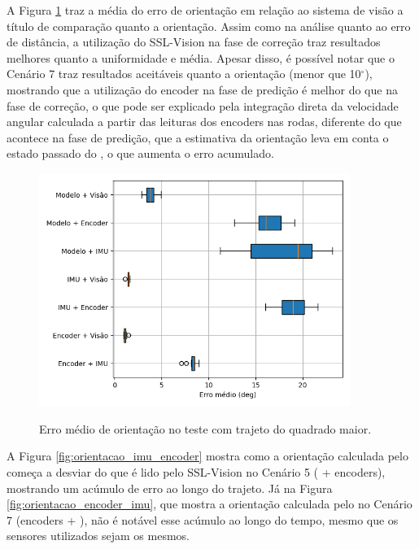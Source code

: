 \documentclass[acronym, symbols, table, deposito]{fei}
\begin{document}
		A Figura \ref{fig:erro_medio_orientacao_quad_maior} traz a média do erro de orientação em relação ao sistema de visão a título de comparação quanto a orientação. Assim como na análise quanto ao erro de distância, a utilização do SSL-Vision na fase de correção traz resultados melhores quanto a uniformidade e média. Apesar disso, é possível notar que o Cenário 7 traz resultados aceitáveis quanto a orientação (menor que 10$^\circ$), mostrando que a utilização do encoder na fase de predição é melhor do que na fase de correção, o que pode ser explicado pela integração direta da velocidade angular calculada a partir das leituras dos encoders nas rodas, diferente do que acontece na fase de predição, que a estimativa da orientação leva em conta o estado passado do , o que aumenta o erro acumulado.
	
		\begin{figure}[!htb]
			\centering
			\caption{Erro médio de orientação no teste com trajeto do quadrado maior.}
			\includegraphics[width=0.9\textwidth]{../Dados/Graficos-Resultados/erro_medio_orientacao_quadrado_maior.png}
			\label{fig:erro_medio_orientacao_quad_maior}
		\end{figure}
	
		A Figura \ref{fig:orientacao_imu_encoder} mostra como a orientação calculada pelo  começa a desviar do que é lido pelo SSL-Vision no Cenário 5 ( + encoders), mostrando um acúmulo de erro ao longo do trajeto. Já na Figura \ref{fig:orientacao_encoder_imu}, que mostra a orientação calculada pelo  no Cenário 7 (encoders + ), não é notável esse acúmulo ao longo do tempo, mesmo que os sensores utilizados sejam os mesmos.
	
\end{document}
